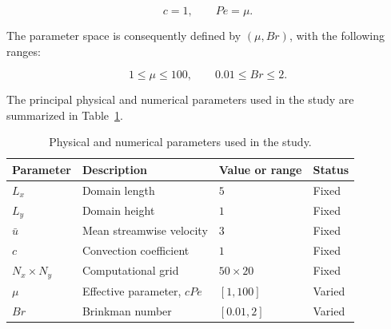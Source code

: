 \begin{equation}
    c=1,
    \qquad
    Pe=\mu.
\end{equation}

The parameter space is consequently defined by $(\mu,Br)$, with the following ranges:

\begin{equation}
    1\leq\mu\leq100,
    \qquad
    0.01\leq Br\leq2.
    \label{eq:parameter_ranges}
\end{equation}

The principal physical and numerical parameters used in the study are summarized in Table~\ref{tab:study_parameters}.

\begin{table}[htbp]
    \centering
    \caption{Physical and numerical parameters used in the study.}
    \label{tab:study_parameters}
    \begin{tabular}{llll}
        \hline
        Parameter & Description & Value or range & Status \\
        \hline
        $L_x$ & Domain length & $5$ & Fixed \\
        $L_y$ & Domain height & $1$ & Fixed \\
        $\bar{u}$ & Mean streamwise velocity & $3$ & Fixed \\
        $c$ & Convection coefficient & $1$ & Fixed \\
        $N_x\times N_y$ & Computational grid & $50\times20$ & Fixed \\
        $\mu$ & Effective parameter, $cPe$ & $[1,100]$ & Varied \\
        $Br$ & Brinkman number & $[0.01,2]$ & Varied \\
        \hline
    \end{tabular}
\end{table}

